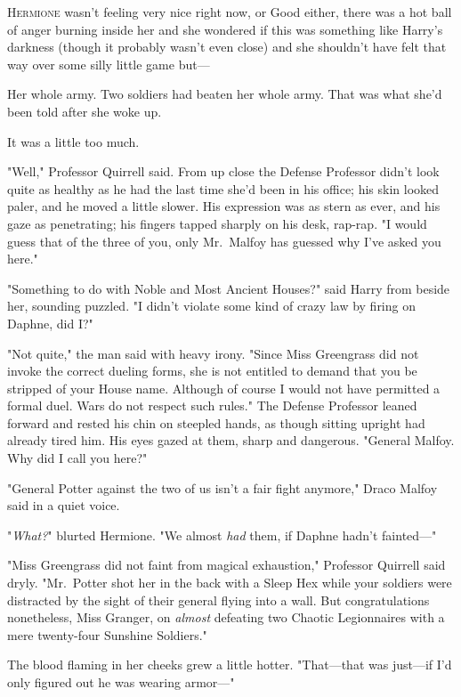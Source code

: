 
\lettrine{H}{ermione} wasn't
feeling very nice right now, or Good either, there was a hot ball of anger
burning inside her and she wondered if this was something like Harry's darkness
(though it probably wasn't even close) and she shouldn't have felt that way
over some silly little game but---

Her whole army. Two soldiers had beaten her whole army. That was what she'd
been told after she woke up.

It was a little too much.

"Well," Professor Quirrell said. From up close the Defense Professor didn't
look quite as healthy as he had the last time she'd been in his office; his
skin looked paler, and he moved a little slower. His expression was as stern as
ever, and his gaze as penetrating; his fingers tapped sharply on his desk,
rap-rap. "I would guess that of the three of you, only Mr.~Malfoy has guessed
why I've asked you here."

"Something to do with Noble and Most Ancient Houses?" said Harry from beside
her, sounding puzzled. "I didn't violate some kind of crazy law by firing on
Daphne, did I?"

"Not quite," the man said with heavy irony. "Since Miss Greengrass did not
invoke the correct dueling forms, she is not entitled to demand that you be
stripped of your House name. Although of course I would not have permitted a
formal duel. Wars do not respect such rules." The Defense Professor leaned
forward and rested his chin on steepled hands, as though sitting upright had
already tired him. His eyes gazed at them, sharp and dangerous. "General
Malfoy. Why did I call you here?"

"General Potter against the two of us isn't a fair fight anymore," Draco Malfoy
said in a quiet voice.

"\emph{What?}" blurted Hermione. "We almost \emph{had} them, if Daphne hadn't
fainted---"

"Miss Greengrass did not faint from magical exhaustion," Professor Quirrell
said dryly. "Mr.~Potter shot her in the back with a Sleep Hex while your
soldiers were distracted by the sight of their general flying into a wall. But
congratulations nonetheless, Miss Granger, on \emph{almost} defeating two
Chaotic Legionnaires with a mere twenty-four Sunshine Soldiers."

The blood flaming in her cheeks grew a little hotter. "That---that was
just---if I'd only figured out he was wearing armor---"

